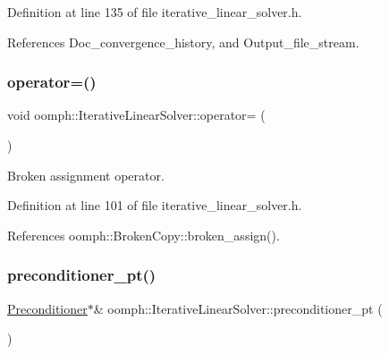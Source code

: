 Definition at line 135 of file iterative\+\_\+linear\+\_\+solver.\+h.



References Doc\+\_\+convergence\+\_\+history, and Output\+\_\+file\+\_\+stream.

\mbox{\label{classoomph_1_1IterativeLinearSolver_a0f152f3c12947a48b71f35674a075a2a}} 
\subsubsection{\texorpdfstring{operator=()}{operator=()}}
{\footnotesize\ttfamily void oomph\+::\+Iterative\+Linear\+Solver\+::operator= (\begin{DoxyParamCaption}\item[{const \hyperlink{classoomph_1_1IterativeLinearSolver}{Iterative\+Linear\+Solver} \&}]{ }\end{DoxyParamCaption})\hspace{0.3cm}{\ttfamily [inline]}}



Broken assignment operator. 



Definition at line 101 of file iterative\+\_\+linear\+\_\+solver.\+h.



References oomph\+::\+Broken\+Copy\+::broken\+\_\+assign().

\mbox{\label{classoomph_1_1IterativeLinearSolver_a800f699ec8dda290105807cb91297850}} 
\subsubsection{\texorpdfstring{preconditioner\+\_\+pt()}{preconditioner\_pt()}\hspace{0.1cm}{\footnotesize\ttfamily [1/2]}}
{\footnotesize\ttfamily \hyperlink{classoomph_1_1Preconditioner}{Preconditioner}$\ast$\& oomph\+::\+Iterative\+Linear\+Solver\+::preconditioner\+\_\+pt (\begin{DoxyParamCaption}{ }\end{DoxyParamCaption})\hspace{0.3cm}{\ttfamily [inline]}}



